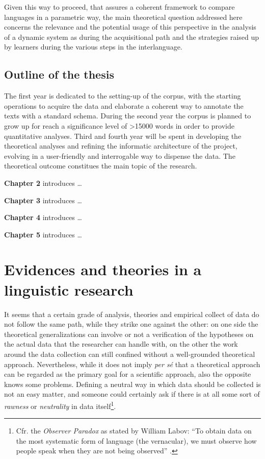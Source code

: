 \documentclass[a4paper,twoside,12pt,chapterprefix=false,bibliography=totocnumbered,listof=flat]{scrbook}
\begin{document}
Given this way to proceed, that assures a coherent framework to compare
languages in a parametric way, the main theoretical question addressed
here concerns the relevance and the potential usage of this perspective
in the analysis of a dynamic system as during the acquisitional path and
the strategies raised up by learners during the various steps in the
interlanguage.

\section{Outline of the thesis}\label{outline-of-the-thesis}

The first year is dedicated to the setting-up of the corpus, with the
starting operations to acquire the data and elaborate a coherent way to
annotate the texts with a standard schema. During the second year the
corpus is planned to grow up for reach a significance level of
\textgreater{}15000 words in order to provide quantitative analyses.
Third and fourth year will be spent in developing the theoretical
analyses and refining the informatic architecture of the project,
evolving in a user-friendly and interrogable way to dispense the data.
The theoretical outcome constitues the main topic of the research.

\textbf{Chapter 2} introduces \ldots{}

\textbf{Chapter 3} introduces \ldots{}

\textbf{Chapter 4} introduces \ldots{}

\textbf{Chapter 5} introduces \ldots{}

\chapter{Evidences and theories in a linguistic
research}\label{evidences-and-theories-in-a-linguistic-research}

It seems that a certain grade of analysis, theories and empirical
collect of data do not follow the same path, while they strike one
against the other: on one side the theoretical generalizations can
involve or not a verification of the hypotheses on the actual data that
the researcher can handle with, on the other the work around the data
collection can still confined without a well-grounded theoretical
approach. Nevertheless, while it does not imply \emph{per sé} that a
theoretical approach can be regarded as the primary goal for a
scientific approach, also the opposite knows some problems. Defining a
neutral way in which data should be collected is not an easy matter, and
someone could certainly ask if there is at all some sort of
\emph{rawness} or \emph{neutrality} in data itself\footnote{Cfr. the
  \emph{Observer Paradox} as stated by William Labov: \enquote{To obtain
  data on the most systematic form of language (the vernacular), we must
  observe how people speak when they are not being observed}
  \citep[xvii]{labov1973}.}.
\end{document}

